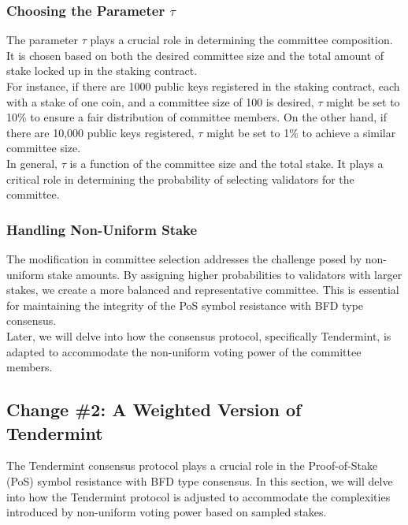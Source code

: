 \subsubsection{Choosing the Parameter $\tau$}
The parameter $\tau$ plays a crucial role in determining the committee composition. It is chosen based on both the desired committee size and the total amount of stake locked up in the staking contract.\\
For instance, if there are 1000 public keys registered in the staking contract, each with a stake of one coin, and a committee size of 100 is desired, $\tau$ might be set to 10\% to ensure a fair distribution of committee members. On the other hand, if there are 10,000 public keys registered, $\tau$ might be set to 1\% to achieve a similar committee size.\\
In general, $\tau$ is a function of the committee size and the total stake. It plays a critical role in determining the probability of selecting validators for the committee.

\subsubsection{Handling Non-Uniform Stake}
The modification in committee selection addresses the challenge posed by non-uniform stake amounts. By assigning higher probabilities to validators with larger stakes, we create a more balanced and representative committee. This is essential for maintaining the integrity of the PoS symbol resistance with BFD type consensus.\\
Later, we will delve into how the consensus protocol, specifically Tendermint, is adapted to accommodate the non-uniform voting power of the committee members.

\subsection{Change \#2: A Weighted Version of Tendermint}
The Tendermint consensus protocol plays a crucial role in the Proof-of-Stake (PoS) symbol resistance with BFD type consensus. In this section, we will delve into how the Tendermint protocol is adjusted to accommodate the complexities introduced by non-uniform voting power based on sampled stakes.


